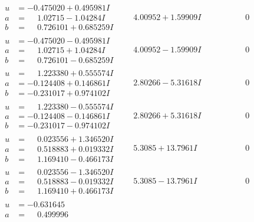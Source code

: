 \documentclass[1p]{elsarticle_modified}
\theoremstyle{definition}
\begin{document}
$$\begin{array}{c|c|c}
\begin{aligned}
u &= -0.475020 + 0.495981 I \\
a &= \phantom{-}1.02715 - 1.04284 I \\
b &= \phantom{-}0.726101 + 0.685259 I\end{aligned}
 & \phantom{-}4.00952 + 1.59909 I & \phantom{-0.000000 } 0 \\ \hline\begin{aligned}
u &= -0.475020 - 0.495981 I \\
a &= \phantom{-}1.02715 + 1.04284 I \\
b &= \phantom{-}0.726101 - 0.685259 I\end{aligned}
 & \phantom{-}4.00952 - 1.59909 I & \phantom{-0.000000 } 0 \\ \hline\begin{aligned}
u &= \phantom{-}1.223380 + 0.555574 I \\
a &= -0.124408 + 0.146861 I \\
b &= -0.231017 + 0.974102 I\end{aligned}
 & \phantom{-}2.80266 - 5.31618 I & \phantom{-0.000000 } 0 \\ \hline\begin{aligned}
u &= \phantom{-}1.223380 - 0.555574 I \\
a &= -0.124408 - 0.146861 I \\
b &= -0.231017 - 0.974102 I\end{aligned}
 & \phantom{-}2.80266 + 5.31618 I & \phantom{-0.000000 } 0 \\ \hline\begin{aligned}
u &= \phantom{-}0.023556 + 1.346520 I \\
a &= \phantom{-}0.518883 + 0.019332 I \\
b &= \phantom{-}1.169410 - 0.466173 I\end{aligned}
 & \phantom{-}5.3085 + 13.7961 I & \phantom{-0.000000 } 0 \\ \hline\begin{aligned}
u &= \phantom{-}0.023556 - 1.346520 I \\
a &= \phantom{-}0.518883 - 0.019332 I \\
b &= \phantom{-}1.169410 + 0.466173 I\end{aligned}
 & \phantom{-}5.3085 - 13.7961 I & \phantom{-0.000000 } 0 \\ \hline\begin{aligned}
u &= -0.631645\phantom{ +0.000000I} \\
a &= \phantom{-}0.499996\phantom{ +0.000000I} \\

\end{aligned}
\end{array}$$
\end{document}

